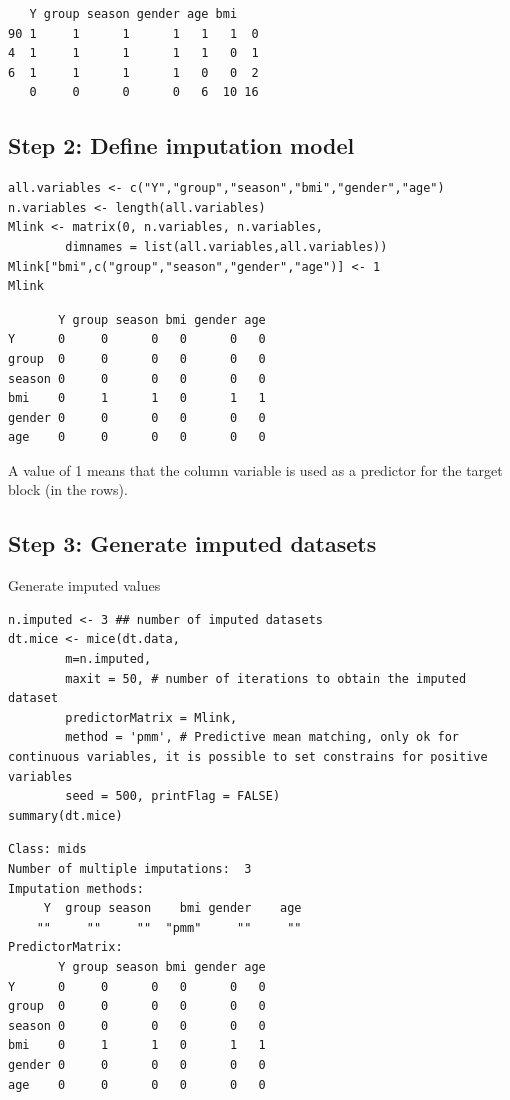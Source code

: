 \documentclass[12pt]{article}
\begin{document}
\begin{verbatim}
   Y group season gender age bmi   
90 1     1      1      1   1   1  0
4  1     1      1      1   1   0  1
6  1     1      1      1   0   0  2
   0     0      0      0   6  10 16
\end{verbatim}


\clearpage

\subsection{Step 2: Define imputation model}
\label{sec:org0bcff7e}

\lstset{language=r,label= ,caption= ,captionpos=b,numbers=none}
\begin{lstlisting}
all.variables <- c("Y","group","season","bmi","gender","age")
n.variables <- length(all.variables)
Mlink <- matrix(0, n.variables, n.variables,
		dimnames = list(all.variables,all.variables))
Mlink["bmi",c("group","season","gender","age")] <- 1
Mlink
\end{lstlisting}

\begin{verbatim}
       Y group season bmi gender age
Y      0     0      0   0      0   0
group  0     0      0   0      0   0
season 0     0      0   0      0   0
bmi    0     1      1   0      1   1
gender 0     0      0   0      0   0
age    0     0      0   0      0   0
\end{verbatim}


A value of 1 means that the column variable is used as a predictor for
 the target block (in the rows).

\clearpage

\subsection{Step 3: Generate imputed datasets}
\label{sec:org7930493}
Generate imputed values
\lstset{language=r,label= ,caption= ,captionpos=b,numbers=none}
\begin{lstlisting}
n.imputed <- 3 ## number of imputed datasets
dt.mice <- mice(dt.data,
		m=n.imputed, 
		maxit = 50, # number of iterations to obtain the imputed dataset
		predictorMatrix = Mlink,
		method = 'pmm', # Predictive mean matching, only ok for continuous variables, it is possible to set constrains for positive variables
		seed = 500, printFlag = FALSE)
summary(dt.mice)
\end{lstlisting}

\begin{verbatim}
Class: mids
Number of multiple imputations:  3 
Imputation methods:
     Y  group season    bmi gender    age 
    ""     ""     ""  "pmm"     ""     "" 
PredictorMatrix:
       Y group season bmi gender age
Y      0     0      0   0      0   0
group  0     0      0   0      0   0
season 0     0      0   0      0   0
bmi    0     1      1   0      1   1
gender 0     0      0   0      0   0
age    0     0      0   0      0   0
\end{verbatim}
\end{document}

